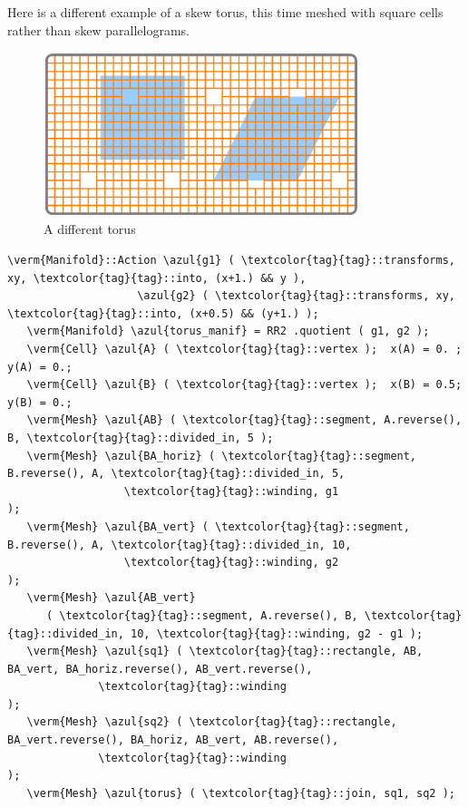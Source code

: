 Here is a different example of a skew torus, this time meshed with square cells
rather than skew parallelograms.

\begin{figure}[ht] \centering
  \includegraphics[width=92mm]{flat-torus-4.eps}
  \caption{A different torus}
  \label{\numb section 7.\numb fig 4}
\end{figure}

\begin{Verbatim}[commandchars=\\\{\},formatcom=\small\tt,frame=single,
   label=parag-\ref{\numb section 7.\numb parag 8}.cpp,rulecolor=\color{coment},
   baselinestretch=0.94,framesep=2mm                                            ]
   \verm{Manifold}::Action \azul{g1} ( \textcolor{tag}{tag}::transforms, xy, \textcolor{tag}{tag}::into, (x+1.) && y ),
                    \azul{g2} ( \textcolor{tag}{tag}::transforms, xy, \textcolor{tag}{tag}::into, (x+0.5) && (y+1.) );
   \verm{Manifold} \azul{torus_manif} = RR2 .quotient ( g1, g2 );
   \verm{Cell} \azul{A} ( \textcolor{tag}{tag}::vertex );  x(A) = 0. ;  y(A) = 0.;
   \verm{Cell} \azul{B} ( \textcolor{tag}{tag}::vertex );  x(B) = 0.5;  y(B) = 0.;
   \verm{Mesh} \azul{AB} ( \textcolor{tag}{tag}::segment, A.reverse(), B, \textcolor{tag}{tag}::divided_in, 5 );
   \verm{Mesh} \azul{BA_horiz} ( \textcolor{tag}{tag}::segment, B.reverse(), A, \textcolor{tag}{tag}::divided_in, 5,
                  \textcolor{tag}{tag}::winding, g1                                  );
   \verm{Mesh} \azul{BA_vert} ( \textcolor{tag}{tag}::segment, B.reverse(), A, \textcolor{tag}{tag}::divided_in, 10,
                  \textcolor{tag}{tag}::winding, g2                                  );
   \verm{Mesh} \azul{AB_vert}
      ( \textcolor{tag}{tag}::segment, A.reverse(), B, \textcolor{tag}{tag}::divided_in, 10, \textcolor{tag}{tag}::winding, g2 - g1 );
   \verm{Mesh} \azul{sq1} ( \textcolor{tag}{tag}::rectangle, AB, BA_vert, BA_horiz.reverse(), AB_vert.reverse(),
              \textcolor{tag}{tag}::winding                                                       );
   \verm{Mesh} \azul{sq2} ( \textcolor{tag}{tag}::rectangle, BA_vert.reverse(), BA_horiz, AB_vert, AB.reverse(),
              \textcolor{tag}{tag}::winding                                                       );
   \verm{Mesh} \azul{torus} ( \textcolor{tag}{tag}::join, sq1, sq2 );
\end{Verbatim}

